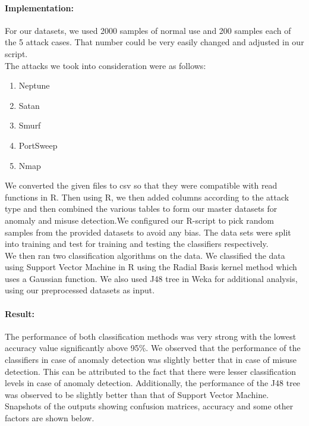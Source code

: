 \documentclass{article}
\begin{document}
 
\paragraph{Implementation:\\}
For our datasets, we used 2000 samples of normal use and 200 samples each of the 5 attack cases. That number could be very easily changed and adjusted in our script.\\
The attacks we took into consideration were as follows:
\begin{enumerate}
  \item Neptune
  \item Satan
  \item Smurf
  \item PortSweep
  \item Nmap
\end{enumerate}
We converted the given files to csv so that they were compatible with read functions in R. Then using R, we then added columns according to the attack type and then combined the various tables to form our master datasets for anomaly and misuse detection.We configured our R-script to pick random samples from the provided datasets to avoid any bias. The data sets were split into training and test for training and testing the classifiers respectively.\\
We then ran two classification algorithms on the data. We classified the data using Support Vector Machine in R using the Radial Basis kernel method which uses a Gaussian function. We also used J48 tree in Weka for additional analysis, using our preprocessed datasets as input.

 
  

\paragraph{Result:\\}
The performance of both classification methods was very strong with the lowest accuracy value significantly above 95\%. We observed that the performance of the classifiers in case of anomaly detection was slightly better that in case of misuse detection. This can be attributed to the fact that there were lesser classification levels in case of anomaly detection. Additionally, the performance of the J48 tree was observed to be slightly better than that of Support Vector Machine. Snapshots of the outputs showing confusion matrices, accuracy and some other factors are shown below. \\
\end{document}

